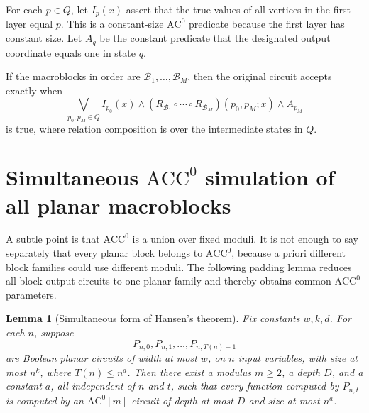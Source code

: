 \documentclass[11pt]{article}
\newtheorem{lemma}[theorem]{Lemma}
\theoremstyle{definition}
\newcommand{\ACC}{\mathrm{ACC}^{0}}
\newcommand{\ACm}[1]{\mathrm{AC}^{0}[#1]}
\newcommand{\cB}{\mathcal{B}}
\begin{document}
For each $p\in Q$, let $I_p(x)$ assert that the true values of all vertices in the first layer equal $p$. This is a constant-size $\mathrm{AC}^0$ predicate because the first layer has constant size. Let $A_q$ be the constant predicate that the designated output coordinate equals one in state $q$.

If the macroblocks in order are $\cB_1,\ldots,\cB_M$, then the original circuit accepts exactly when
\begin{equation}\label{eq:acceptance}
  \bigvee_{p_0,p_M\in Q}
  I_{p_0}(x)\wedge
  (R_{\cB_1}\circ\cdots\circ R_{\cB_M})(p_0,p_M;x)
  \wedge A_{p_M}
\end{equation}
is true, where relation composition is over the intermediate states in $Q$.

\section{Simultaneous $\ACC$ simulation of all planar macroblocks}

A subtle point is that $\ACC$ is a union over fixed moduli. It is not enough to say separately that every planar block belongs to $\ACC$, because a priori different block families could use different moduli. The following padding lemma reduces all block-output circuits to one planar family and thereby obtains common $\ACC$ parameters.

\begin{lemma}[Simultaneous form of Hansen's theorem]\label{lem:simultaneous-hansen}
Fix constants $w,k,d$. For each $n$, suppose
\[
  P_{n,0},P_{n,1},\ldots,P_{n,T(n)-1}
\]
are Boolean planar circuits of width at most $w$, on $n$ input variables, with size at most $n^k$, where $T(n)\le n^d$. Then there exist a modulus $m\ge 2$, a depth $D$, and a constant $a$, all independent of $n$ and $t$, such that every function computed by $P_{n,t}$ is computed by an $\ACm{m}$ circuit of depth at most $D$ and size at most $n^a$.
\end{lemma}
\end{document}
